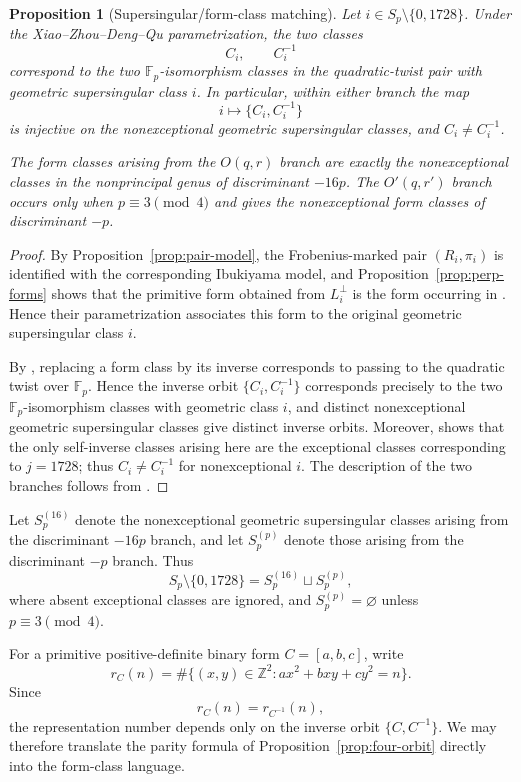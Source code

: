 \documentclass[11pt]{amsart}
\newtheorem{proposition}[theorem]{Proposition}
\theoremstyle{definition}
\theoremstyle{remark}
\newcommand{\Z}{\mathbb{Z}}
\newcommand{\F}{\mathbb{F}}
\begin{document}
\begin{proposition}[Supersingular/form-class matching]
\label{prop:xzdq-compatibility}
Let $i\in S_p\setminus\{0,1728\}$. Under the
Xiao--Zhou--Deng--Qu parametrization, the two classes
\[
  C_i,\qquad C_i^{-1}
\]
correspond to the two $\F_p$-isomorphism classes in the quadratic-twist
pair with geometric supersingular class $i$. In particular, within either
branch the map
\[
  i\longmapsto\{C_i,C_i^{-1}\}
\]
is injective on the nonexceptional geometric supersingular classes, and
$C_i\ne C_i^{-1}$.

The form classes arising from the $O(q,r)$ branch are exactly the
nonexceptional classes in the nonprincipal genus of discriminant $-16p$.
The $O'(q,r')$ branch occurs only when $p\equiv3\pmod4$ and gives the
nonexceptional form classes of discriminant $-p$.
\end{proposition}

\begin{proof}
By Proposition~\ref{prop:pair-model}, the Frobenius-marked pair
$(R_i,\pi_i)$ is identified with the corresponding Ibukiyama model, and
Proposition~\ref{prop:perp-forms} shows that the primitive form obtained
from $L_i^\perp$ is the form occurring in
\cite[Theorems~3.3 and~3.5]{XZDQ2025}. Hence their parametrization
associates this form to the original geometric supersingular class $i$.

By \cite[Theorem~3.7]{XZDQ2025}, replacing a form class by its inverse
corresponds to passing to the quadratic twist over $\F_p$. Hence the
inverse orbit $\{C_i,C_i^{-1}\}$ corresponds precisely to the two
$\F_p$-isomorphism classes with geometric class $i$, and distinct
nonexceptional geometric supersingular classes give distinct inverse
orbits. Moreover, \cite[Remark~3.6]{XZDQ2025} shows that the only
self-inverse classes arising here are the exceptional classes
corresponding to $j=1728$; thus $C_i\ne C_i^{-1}$ for nonexceptional
$i$. The description of the two branches follows from
\cite[Theorems~3.5 and~3.7]{XZDQ2025}.
\end{proof}

Let $S_p^{(16)}$ denote the nonexceptional geometric supersingular classes
arising from the discriminant $-16p$ branch, and let $S_p^{(p)}$ denote
those arising from the discriminant $-p$ branch. Thus
\[
  S_p\setminus\{0,1728\}
  =
  S_p^{(16)}\sqcup S_p^{(p)},
\]
where absent exceptional classes are ignored, and
$S_p^{(p)}=\varnothing$ unless $p\equiv3\pmod4$.

For a primitive positive-definite binary form $C=[a,b,c]$, write
\[
  r_C(n)
  =
  \#\{(x,y)\in\Z^2:ax^2+bxy+cy^2=n\}.
\]
Since
\[
  r_C(n)=r_{C^{-1}}(n),
\]
the representation number depends only on the inverse orbit
$\{C,C^{-1}\}$. We may therefore translate the parity formula of
Proposition~\ref{prop:four-orbit} directly into the form-class language.
\end{document}
